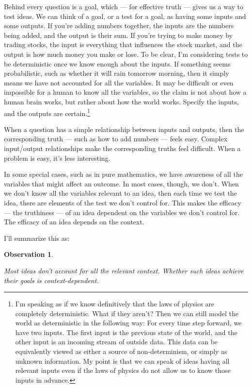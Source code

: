 \documentclass[11pt, oneside]{article}   	%
\newtheorem{obs}{Observation}
\begin{document}
Behind every question is a goal, which --- for effective truth --- gives
us a way to test ideas.
We can think of a goal, or a test for a goal, as having some inputs
and some outputs.
If you're adding numbers together,
the inputs are the numbers being added, and
the output is their sum.
If you're trying to make money by trading stocks,
the input is everything
that influences the stock market,
and the output is how much
money you make or lose.
To be clear, I'm considering tests to be deterministic once we know enough
about the inputs.
If something seems probabilistic,
such as whether it will
rain tomorrow morning, then it simply means we have not accounted for all
the variables.
It may be difficult or even impossible for a human to know all
the variables, so the claim is not about how a human brain works, but rather
about how the world works.
Specify the inputs, and the outputs are certain.\footnote{I'm speaking as if we
know definitively that the laws of physics are completely deterministic. What if
they aren't? Then we can still model the world as deterministic in the following
way: For every time step forward, we have two inputs. The first input is the
previous state of the world, and the other input is an incoming stream of
outside data. This data can be equivalently viewed as either a source of
non-determinism, or simply as unknown information. My point is that we can speak
of
ideas having all relevant inputs even if the laws of physics do not allow us to
know those inputs in advance.}

When a question has a simple relationship between inputs and outputs, then the
corresponding truth --- such as how to add numbers --- feels easy. Complex
input/output relationships make the corresponding truths feel difficult.
When a problem is easy, it's less interesting.

In some special cases, such as in pure mathematics,
we have awareness of all the variables that might affect an outcome.
In most cases, though, we don't.
When we don't know all the variables relevant to an idea, then each time we
test the idea, there are elements of the test we don't control for.
This makes the efficacy --- the truthiness --- of an idea dependent on the
variables we don't control for. The efficacy of an idea
depends on the context.

\pagebreak

I'll summarize this as:
\newcommand{\obssix}{
    Most ideas don't account for all the relevant context.
    Whether such ideas achieve their goals is context-dependent.
}
\begin{obs}\label{o6}
    \obssix
\end{obs}
\end{document}

